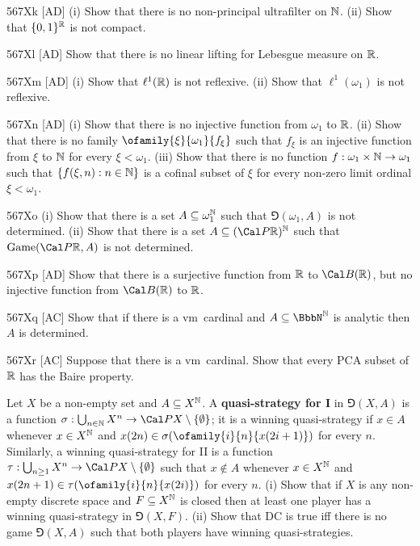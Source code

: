 {\spheader 567Xk [AD] (i) Show that there is no non-principal ultrafilter on
$\Bbb N$.   (ii) Show that $\{0,1\}^{\Bbb R}$ is not compact.

\spheader 567Xl [AD] Show that there is no linear
lifting for Lebesgue measure on $\Bbb R$.   

\spheader 567Xm [AD] (i) Show that $\ell^1(\Bbb R)$ is not reflexive.
(ii) Show that $\ell^1(\omega_1)$ is not reflexive.

\spheader 567Xn [AD] (i) Show that there is no injective function from
$\omega_1$ to $\Bbb R$.   (ii) Show that there is no family
$\ofamily{\xi}{\omega_1}{f_{\xi}}$ such that $f_{\xi}$ is an injective
function from $\xi$ to $\Bbb N$ for every $\xi<\omega_1$.   (iii) Show that
there is no function $f:\omega_1\times\Bbb N\to\omega_1$ such that
$\{f(\xi,n):n\in\Bbb N\}$ is a cofinal subset
of $\xi$ for every non-zero limit ordinal $\xi<\omega_1$.   

\spheader 567Xo (i) Show that there is a set $A\subseteq\omega_1^{\Bbb N}$
such that $\Game(\omega_1,A)$ is not determined.   
(ii) Show that there is a set $A\subseteq(\Cal P\Bbb R)^{\Bbb N}$
such that $\Game(\Cal P\Bbb R,A)$ is not determined.

\spheader 567Xp [AD] Show that there is a surjective function from
$\Bbb R$ to $\Cal B(\Bbb R)$, but no injective function from
$\Cal B(\Bbb R)$ to $\Bbb R$.   

\spheader 567Xq [AC] Show that if there is a \2vm\ cardinal and
$A\subseteq\NN$ is analytic then $A$ is determined.

\spheader 567Xr [AC] Suppose that there is a \2vm\ cardinal.   Show
that every PCA subset of $\Bbb R$ has the Baire property.

Let $X$ be a non-empty
set and $A\subseteq X^{\Bbb N}$.   A
{\bf quasi-strategy for I} in $\Game(X,A)$ is a function
$\sigma:\bigcup_{n\in\Bbb N}X^n\to\Cal PX\setminus\{\emptyset\}$;  it
is a winning quasi-strategy if $x\in A$ whenever $x\in X^{\Bbb N}$ and
$x(2n)\in\sigma(\ofamily{i}{n}{x(2i+1)})$ for every $n$.   Similarly, a
winning quasi-strategy for II is a function
$\tau:\bigcup_{n\ge 1}X^n\to\Cal PX\setminus\{\emptyset\}$ such that
$x\notin A$ whenever $x\in X^{\Bbb N}$ and
$x(2n+1)\in\tau(\ofamily{i}{n}{x(2i)})$ for every $n$.
(i) Show that if $X$ is any non-empty discrete space
and $F\subseteq X^{\Bbb N}$ is closed then at least one player has a
winning quasi-strategy in $\Game(X,F)$.
(ii) Show that DC is true iff there is no game $\Game(X,A)$ such that
both players have winning quasi-strategies.

}
